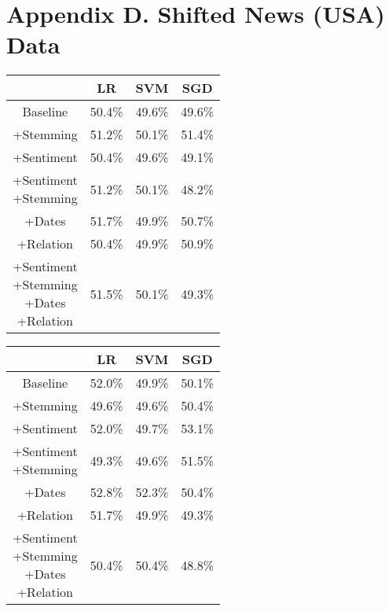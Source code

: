 \documentclass[11pt,a4paper]{article}
\begin{document}
\section{Appendix D. Shifted News (USA) Data}
\begin{center}
\begin{tabular}{ |c|c|c|c| }
 \hline
  & LR & SVM & SGD \\
  \hline
  Baseline & 50.4\% & 49.6\% & 49.6\% \\
  \hline
 +Stemming & 51.2\% & 50.1\% & 51.4\% \\
  \hline
 +Sentiment & 50.4\% & 49.6\% & 49.1\% \\
  \hline
  \shortstack{+Sentiment \\ +Stemming} & 51.2\% & 50.1\% & 48.2\%\\
 \hline
 +Dates & 51.7\% & 49.9\% & 50.7\% \\
  \hline
 +Relation & 50.4\% & 49.9\% & 50.9\% \\
  \hline
  \shortstack{+Sentiment \\ +Stemming \\+Dates \\+Relation} & 51.5\% & 50.1\% & 49.3\% \\
 \hline
\end{tabular}
\end{center}

\vspace{40mm}
\begin{center}
\begin{tabular}{ |c|c|c|c| }
 \hline
  & LR & SVM & SGD \\
  \hline
  Baseline & 52.0\% & 49.9\% & 50.1\% \\
  \hline
 +Stemming & 49.6\% & 49.6\% & 50.4\% \\
  \hline
 +Sentiment & 52.0\% & 49.7\%  & 53.1\% \\
  \hline
  \shortstack{+Sentiment \\ +Stemming} & 49.3\% & 49.6\% & 51.5\%\\
 \hline
 +Dates & 52.8\% & 52.3\% & 50.4\% \\
  \hline
 +Relation & 51.7\% & 49.9\% & 49.3\% \\
  \hline
  \shortstack{+Sentiment \\ +Stemming \\+Dates \\+Relation} & 50.4\% & 50.4\% & 48.8\% \\
 \hline
\end{tabular}
\end{center}
\end{document}
